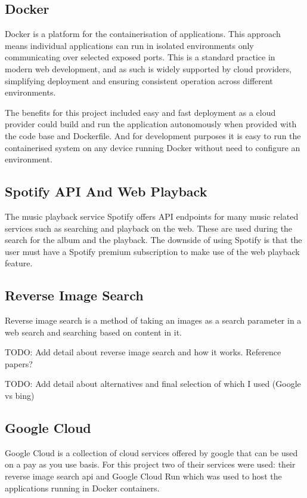 \subsection{Docker}
Docker is a platform for the containerisation of applications. This approach means individual applications can run in isolated environments only communicating over selected exposed ports. This is a standard practice in modern web development, and as such is widely supported by cloud providers, simplifying deployment and ensuring consistent operation across different environments.

The benefits for this project included easy and fast deployment as a cloud provider could build and run the application autonomously when provided with the code base and Dockerfile. And for development purposes it is easy to run the containerised system on any device running Docker without need to configure an environment.

\subsection{Spotify API And Web Playback}
The music playback service Spotify offers API endpoints for many music related services such as searching and playback on the web. These are used during the search for the album and the playback. The downside of using Spotify is that the user must have a Spotify premium subscription to make use of the web playback feature.

\subsection{Reverse Image Search}
Reverse image search is a method of taking an images as a search parameter in a web search and searching based on content in it.

TODO: Add detail about reverse image search and how it works. Reference papers?

TODO: Add detail about alternatives and final selection of which I used (Google vs bing)

\subsection{Google Cloud}
Google Cloud is a collection of cloud services offered by google that can be used on a pay as you use basis. For this project two of their services were used: their reverse image search api and Google Cloud Run which was used to host the applications running in Docker containers.

